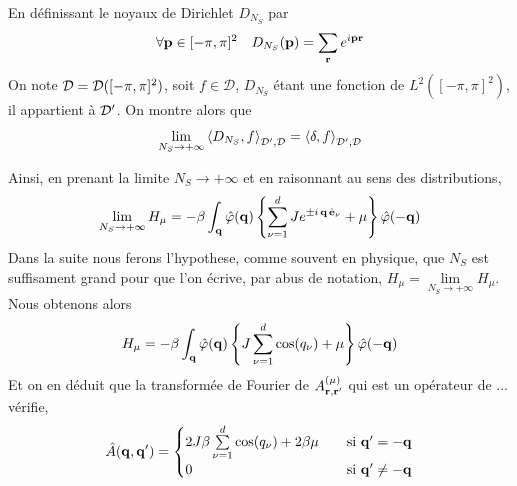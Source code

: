 \documentclass[10pt]{article}
\begin{document}
\begin{multicols}{2}
\begin{equation}
\end{equation}
En définissant le noyaux de Dirichlet $D_{N_S}$ par
\begin{equation}
  \forall {\bf p} \in [-\pi, \pi]^2 \quad D_{N_S} ({\bf p}) =  \sum_{{\bf r}} e^{i {\bf p} {\bf r}} 
\end{equation}
On note $\mathcal{D} = \mathcal{D}([-\pi, \pi]^2)$, soit $f \in \mathcal{D}$, $D_{N_S}$ étant une fonction de $L^2([-\pi, \pi]^2)$, il appartient à $\mathcal{D}'$. On montre alors que \cite{}
\begin{equation}
  \lim\limits_{N_S \rightarrow +\infty} \left< D_{N_S} , f \right>_{\mathcal{D}', \mathcal{D}} =  \left< \delta , f \right>_{\mathcal{D}', \mathcal{D}}
\end{equation}


Ainsi, en prenant la limite $N_S \rightarrow + \infty$ et en raisonnant au sens des distributions,
\begin{equation}
 \lim_{N_S \rightarrow + \infty} H_\mu = -\beta \int_{\bf q} \hat{\varphi}({\bf q})  \left\{ \sum\limits_{\nu=1}^{d}  Je^{\pm i\, {\bf q} \, \hat{\mathbf{e}}_\nu} + \mu \right\}\hat{\varphi}(-{\bf q})
\end{equation}
Dans la suite nous ferons l'hypothese, comme souvent en physique, que $N_S$ est suffisament grand pour que l'on écrive, par abus de notation, $H_\mu = \lim\limits_{N_S \rightarrow + \infty} H_\mu$. \\
Nous obtenons alors
\begin{equation}
  H_\mu = -\beta \int_{\bf q} \hat{\varphi}({\bf q})  \left\{ J \sum\limits_{\nu=1}^{d} \cos(q_\nu) + \mu \right\}\hat{\varphi}(-{\bf q})
\end{equation}
Et on en déduit que la transformée de Fourier de $A_{{\bf r}, {\bf r}'}^{(\mu)}$ qui est un opérateur de ... vérifie,
\begin{align}
  \hat{A}({\bf q}, {\bf q}') = 
  \begin{cases}
    2J\beta \sum\limits_{\nu=1}^{d} \cos(q_\nu) + 2\beta\mu \quad & \text{si } {\bf q}' = - {\bf q}\\
    0 \quad & \text{si } {\bf q}' \neq - {\bf q}
  \end{cases}
\end{align}


\end{multicols}
\end{document}
